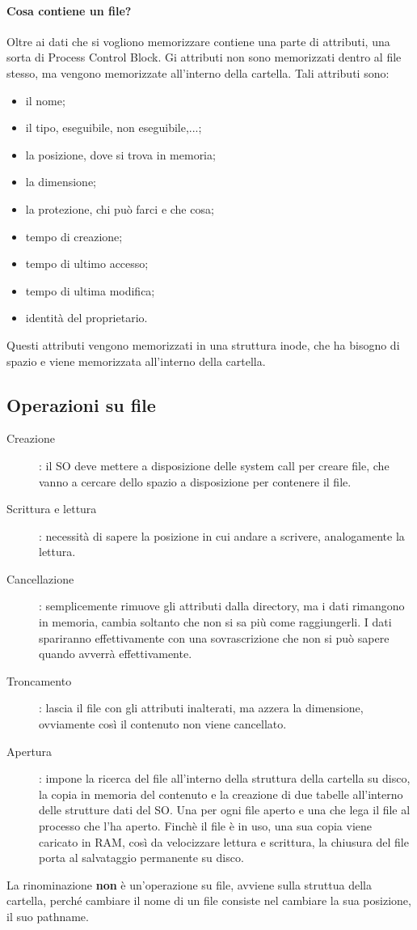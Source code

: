 \documentclass[a4paper, 12pt]{book}
\begin{document}
\paragraph{Cosa contiene un file?} Oltre ai dati 
che si vogliono memorizzare contiene una parte di attributi,
una sorta di Process Control Block. Gi attributi non sono 
memorizzati dentro al file stesso, ma vengono memorizzate 
all'interno della cartella. Tali attributi sono:
\begin{itemize}
    \item il nome;
    \item il tipo, eseguibile, non eseguibile,...;
    \item la posizione, dove si trova in memoria;
    \item la dimensione;
    \item la protezione, chi può farci e che cosa;
    \item tempo di creazione;
    \item tempo di ultimo accesso;
    \item tempo di ultima modifica;
    \item identità del proprietario.
\end{itemize}
Questi attributi vengono memorizzati in una struttura 
inode, che ha bisogno di spazio e viene memorizzata 
all'interno della cartella.

\subsection{Operazioni su file}

\begin{description}
    \item[Creazione]: il SO deve mettere a disposizione delle 
    system call per creare file, che vanno a cercare dello 
    spazio a disposizione per contenere il file.
    \item[Scrittura e lettura]: necessità di sapere la 
    posizione in cui andare a scrivere, analogamente la 
    lettura.
    \item[Cancellazione]: semplicemente rimuove gli 
    attributi dalla directory, ma i dati rimangono in memoria,
    cambia soltanto che non si sa più come raggiungerli.
    I dati spariranno effettivamente con una sovrascrizione
    che non si può sapere quando avverrà effettivamente.
    \item[Troncamento]: lascia il file con gli attributi 
    inalterati, ma azzera la dimensione, ovviamente così 
    il contenuto non viene cancellato.
    \item[Apertura]: impone la ricerca del file all'interno
    della struttura della cartella su disco, la copia in memoria 
    del contenuto e la creazione di due tabelle all'interno 
    delle strutture dati del SO. Una per ogni file aperto 
    e una che lega il file al processo che l'ha aperto.
    Finchè il file è in uso, una sua copia viene 
    caricato in RAM, così da velocizzare lettura e scrittura, 
    la chiusura del file porta al salvataggio permanente 
    su disco.
\end{description}
La rinominazione \textbf{non} è un'operazione su file, 
avviene sulla struttua della cartella, perché cambiare il 
nome di un file consiste nel cambiare la sua posizione, 
il suo pathname.
\end{document}
